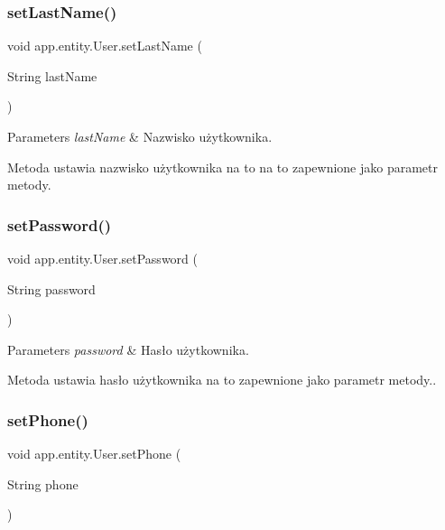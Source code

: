 \subsubsection{\texorpdfstring{setLastName()}{setLastName()}}
{\footnotesize\ttfamily void app.\+entity.\+User.\+set\+Last\+Name (\begin{DoxyParamCaption}\item[{String}]{last\+Name }\end{DoxyParamCaption})}


\begin{DoxyParams}{Parameters}
{\em last\+Name} & Nazwisko użytkownika.\\
\hline
\end{DoxyParams}
Metoda ustawia nazwisko użytkownika na to na to zapewnione jako parametr metody. \mbox{\label{classapp_1_1entity_1_1_user_ae88901bf64afd57c2d72f928ed725bc7}} 
\subsubsection{\texorpdfstring{setPassword()}{setPassword()}}
{\footnotesize\ttfamily void app.\+entity.\+User.\+set\+Password (\begin{DoxyParamCaption}\item[{String}]{password }\end{DoxyParamCaption})}


\begin{DoxyParams}{Parameters}
{\em password} & Hasło użytkownika.\\
\hline
\end{DoxyParams}
Metoda ustawia hasło użytkownika na to zapewnione jako parametr metody.. \mbox{\label{classapp_1_1entity_1_1_user_aefe0c9ee87b30227cff5d378ddbc53c2}} 
\subsubsection{\texorpdfstring{setPhone()}{setPhone()}}
{\footnotesize\ttfamily void app.\+entity.\+User.\+set\+Phone (\begin{DoxyParamCaption}\item[{String}]{phone }\end{DoxyParamCaption})}


